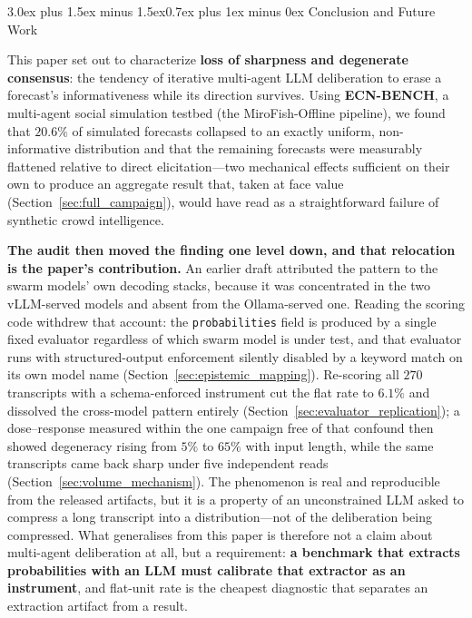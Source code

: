 \documentclass[11pt,journal,onecolumn]{IEEEtran}
\makeatletter
\renewcommand\section{\@startsection{section}{1}{\z@}%
  {3.0ex plus 1.5ex minus 1.5ex}{0.7ex plus 1ex minus 0ex}%
  {\normalfont\normalsize\centering\bfseries}}
\makeatother
\begin{document}
\section{Conclusion and Future Work}
\label{sec:conclusion}

This paper set out to characterize \textbf{loss of sharpness and degenerate consensus}: the tendency of iterative multi-agent LLM deliberation to erase a forecast's informativeness while its direction survives. Using \textbf{ECN-BENCH}, a multi-agent social simulation testbed (the MiroFish-Offline pipeline), we found that $20.6\%$ of simulated forecasts collapsed to an exactly uniform, non-informative distribution and that the remaining forecasts were measurably flattened relative to direct elicitation---two mechanical effects sufficient on their own to produce an aggregate result that, taken at face value (Section~\ref{sec:full_campaign}), would have read as a straightforward failure of synthetic crowd intelligence.

\textbf{The audit then moved the finding one level down, and that relocation is the paper's contribution.} An earlier draft attributed the pattern to the swarm models' own decoding stacks, because it was concentrated in the two vLLM-served models and absent from the Ollama-served one. Reading the scoring code withdrew that account: the \texttt{probabilities} field is produced by a single fixed evaluator regardless of which swarm model is under test, and that evaluator runs with structured-output enforcement silently disabled by a keyword match on its own model name (Section~\ref{sec:epistemic_mapping}). Re-scoring all $270$ transcripts with a schema-enforced instrument cut the flat rate to $6.1\%$ and dissolved the cross-model pattern entirely (Section~\ref{sec:evaluator_replication}); a dose--response measured within the one campaign free of that confound then showed degeneracy rising from $5\%$ to $65\%$ with input length, while the same transcripts came back sharp under five independent reads (Section~\ref{sec:volume_mechanism}). The phenomenon is real and reproducible from the released artifacts, but it is a property of an unconstrained LLM asked to compress a long transcript into a distribution---not of the deliberation being compressed. What generalises from this paper is therefore not a claim about multi-agent deliberation at all, but a requirement: \textbf{a benchmark that extracts probabilities with an LLM must calibrate that extractor as an instrument}, and flat-unit rate is the cheapest diagnostic that separates an extraction artifact from a result.
\end{document}
